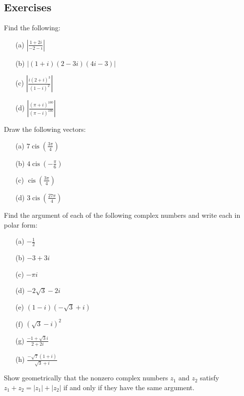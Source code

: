 \subsection{Exercises}
\begin{exercise}
    Find the following:
    \begin{enumerate}
        \item[(a)] \( \left| \frac{1 + 2i}{-2 - i} \right| \)
        \item[(b)] \( \left| (1 + i)(2 - 3i)(4i - 3) \right| \)
        \item[(c)] \( \left| \frac{i(2 + i)^3}{(1 - i)^2} \right| \)
        \item[(d)] \( \left| \frac{(\pi + i)^{100}}{(\pi - i)^{100}} \right| \)
    \end{enumerate}
\end{exercise}
\begin{exercise}
    Draw the following vectors:
    \begin{enumerate}
        \item[(a)] \( 7 \operatorname{cis}\left(\frac{3\pi}{4}\right) \)
        \item[(b)] \( 4 \operatorname{cis}\left(-\frac{\pi}{6}\right) \)
        \item[(c)] \( \operatorname{cis}\left(\frac{3\pi}{4}\right) \)
        \item[(d)] \( 3 \operatorname{cis}\left(\frac{27\pi}{4}\right) \)
    \end{enumerate}
\end{exercise}
\begin{exercise}
    Find the argument of each of the following complex numbers and write each in polar form:
    \begin{enumerate}
        \item[(a)] \( -\frac{1}{2} \)
        \item[(b)] \( -3 + 3i \)
        \item[(c)] \( -\pi i \)
        \item[(d)] \( -2\sqrt{3} - 2i \)
        \item[(e)] \( (1 - i)(-\sqrt{3} + i) \)
        \item[(f)] \( (\sqrt{3} - i)^2 \)
        \item[(g)] \( \frac{-1 + \sqrt{3}i}{2 + 2i} \)
        \item[(h)] \( \frac{-\sqrt{7}(1 + i)}{\sqrt{3} + i} \)
    \end{enumerate}
\end{exercise}
\begin{exercise}
    Show geometrically that the nonzero complex numbers \( z_1 \) and \( z_2 \) satisfy \( z_1 + z_2 = |z_1| + |z_2| \) if and only if they have the same argument.
\end{exercise}
